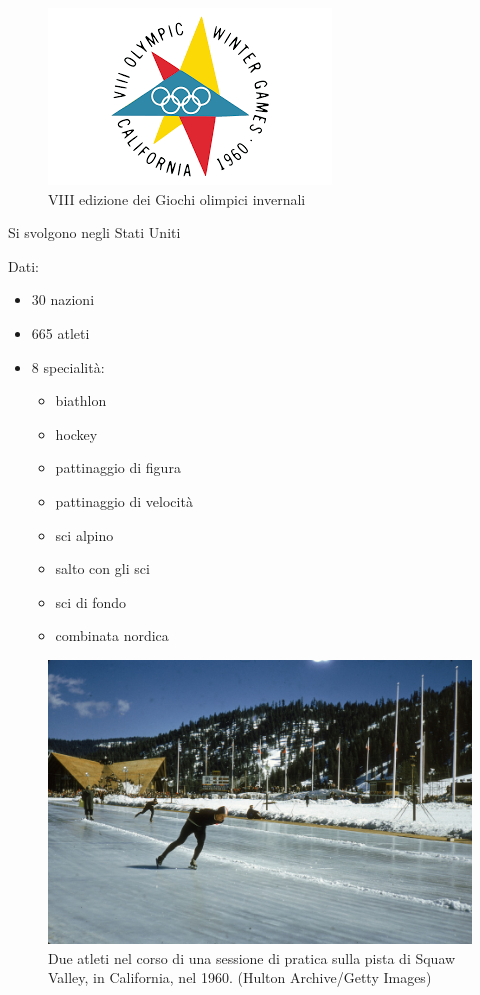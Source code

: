 \documentclass[
]{book}
\providecommand{\tightlist}{%
  \setlength{\itemsep}{0pt}\setlength{\parskip}{0pt}}
\begin{document}
\begin{figure}
\includegraphics[width=0.4\linewidth]{images/loghi/1960} \caption{VIII edizione dei Giochi olimpici invernali}\label{fig:unnamed-chunk-22}
\end{figure}

Si svolgono negli Stati Uniti

Dati:

\begin{itemize}
\tightlist
\item
  30 nazioni
\item
  665 atleti
\item
  8 specialità:

  \begin{itemize}
  \tightlist
  \item
    biathlon
  \item
    hockey
  \item
    pattinaggio di figura
  \item
    pattinaggio di velocità
  \item
    sci alpino
  \item
    salto con gli sci
  \item
    sci di fondo
  \item
    combinata nordica
  \end{itemize}
\end{itemize}

\begin{figure}
\includegraphics[width=0.8\linewidth]{images/IlPost/1960} \caption{Due atleti nel corso di una sessione di pratica sulla pista di Squaw Valley, in California, nel 1960. (Hulton Archive/Getty Images)}\label{fig:unnamed-chunk-23}
\end{figure}
\end{document}
